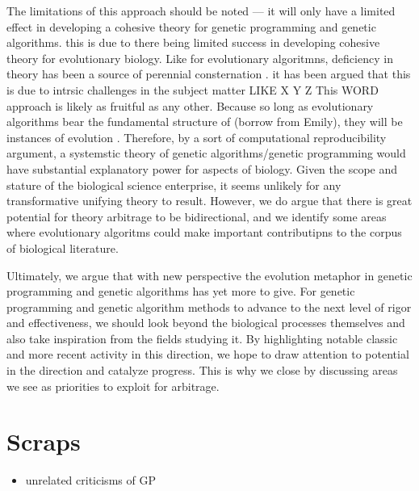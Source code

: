 The limitations of this approach should be noted --- it will only have a limited effect in developing a cohesive theory for genetic programming and genetic algorithms.
this is due to there being limited success in developing cohesive theory for evolutionary biology.
Like for evolutionary algoritmns, deficiency in theory has been a source of perennial consternation \citep{welch2017wrong}.
it has been argued that this is due to intrsic challenges in the subject matter LIKE X Y Z
This WORD approach is likely as fruitful as any other.
Because so long as evolutionary algorithms bear the fundamental structure of (borrow from Emily), they will be instances of evolution \citep{pennock2007models}.
Therefore, by a sort of computational reproducibility argument, a systemstic theory of genetic algorithms/genetic programming would have substantial explanatory power for aspects of biology.
Given the scope and stature of the biological science enterprise, it seems unlikely for any transformative unifying theory to result.
However, we do argue that there is great potential for theory arbitrage to be bidirectional, and we identify some areas where evolutionary algoritms could make important contributipns to the corpus of biological literature.

Ultimately, we argue that with new perspective the evolution metaphor in genetic programming and genetic algorithms has yet more to give.
For genetic programming and genetic algorithm methods to advance to the next level of rigor and effectiveness, we should look beyond the biological processes themselves and also take inspiration from the fields studying it.
By highlighting notable classic and more recent activity in this direction, we hope to draw attention to potential in the direction and catalyze progress.
This is why we close by discussing areas we see as priorities to exploit for arbitrage.

\section{Scraps}

\begin{itemize}
  \item unrelated criticisms of GP \citep{yampolskiy2018we, woodward2016gp}
\end{itemize}
